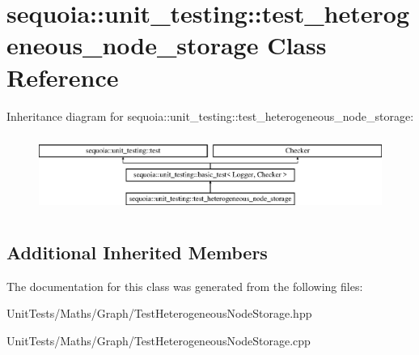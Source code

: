 \hypertarget{classsequoia_1_1unit__testing_1_1test__heterogeneous__node__storage}{}\section{sequoia\+::unit\+\_\+testing\+::test\+\_\+heterogeneous\+\_\+node\+\_\+storage Class Reference}
\label{classsequoia_1_1unit__testing_1_1test__heterogeneous__node__storage}
Inheritance diagram for sequoia\+::unit\+\_\+testing\+::test\+\_\+heterogeneous\+\_\+node\+\_\+storage\+:\begin{figure}[H]
\begin{center}
\leavevmode
\includegraphics[height=2.530120cm]{classsequoia_1_1unit__testing_1_1test__heterogeneous__node__storage}
\end{center}
\end{figure}
\subsection*{Additional Inherited Members}


The documentation for this class was generated from the following files\+:\begin{DoxyCompactItemize}
\item 
Unit\+Tests/\+Maths/\+Graph/Test\+Heterogeneous\+Node\+Storage.\+hpp\item 
Unit\+Tests/\+Maths/\+Graph/Test\+Heterogeneous\+Node\+Storage.\+cpp\end{DoxyCompactItemize}
